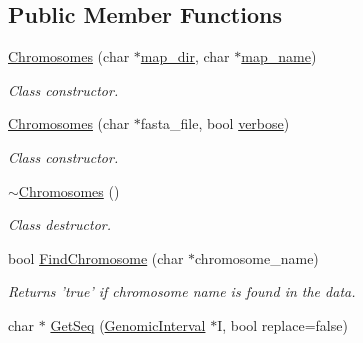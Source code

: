 \subsection*{Public Member Functions}
\begin{CompactItemize}
\item 
\hyperlink{classChromosomes_a596430d4a05ce0dc4d4f43c650db83e}{Chromosomes} (char $\ast$\hyperlink{classChromosomes_8df459fcb5ad98a2524fd51ac2b5a60c}{map\_\-dir}, char $\ast$\hyperlink{classChromosomes_9c690f19e04e80b056dac2072476f24c}{map\_\-name})
\begin{CompactList}\small\item\em Class constructor. \item\end{CompactList}\item 
\hyperlink{classChromosomes_bb3466c6c94f42f22a872b043c415b67}{Chromosomes} (char $\ast$fasta\_\-file, bool \hyperlink{classChromosomes_954bae240564f6f589a30d253291eb75}{verbose})
\begin{CompactList}\small\item\em Class constructor. \item\end{CompactList}\item 
\hypertarget{classChromosomes_0b04a0781b2ff7088dd8046493385003}{
\hyperlink{classChromosomes_0b04a0781b2ff7088dd8046493385003}{$\sim$Chromosomes} ()}
\label{classChromosomes_0b04a0781b2ff7088dd8046493385003}

\begin{CompactList}\small\item\em Class destructor. \item\end{CompactList}\item 
\hypertarget{classChromosomes_2378b5cab810d50699d97883fe1c04bf}{
bool \hyperlink{classChromosomes_2378b5cab810d50699d97883fe1c04bf}{FindChromosome} (char $\ast$chromosome\_\-name)}
\label{classChromosomes_2378b5cab810d50699d97883fe1c04bf}

\begin{CompactList}\small\item\em Returns 'true' if chromosome name is found in the data. \item\end{CompactList}\item 
\hypertarget{classChromosomes_819d0fa5f41c034a45949156307d02e4}{
char $\ast$ \hyperlink{classChromosomes_819d0fa5f41c034a45949156307d02e4}{GetSeq} (\hyperlink{classGenomicInterval}{GenomicInterval} $\ast$I, bool replace=false)}
\label{classChromosomes_819d0fa5f41c034a45949156307d02e4}


\end{CompactItemize}
